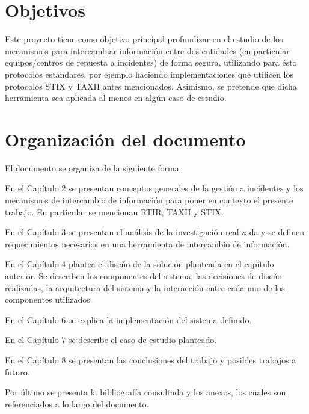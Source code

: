 \section{Objetivos}
\label{capitulo1:objetivos}
Este proyecto tiene como objetivo principal profundizar en el estudio de los mecanismos para intercambiar información entre dos entidades (en particular equipos/centros de repuesta a incidentes) de forma segura, utilizando para ésto protocolos estándares, por ejemplo haciendo implementaciones que utilicen  los protocolos STIX y TAXII antes mencionados. Asimismo, se pretende que dicha herramienta sea aplicada al menos en algún caso de estudio.

\section{Organización del documento}
\label{capitulo1:organizacion}
El documento se organiza de la siguiente forma.

En el Capítulo 2 se presentan conceptos generales de la gestión a incidentes y los mecanismos de intercambio de información para poner en contexto el presente trabajo. En particular se mencionan RTIR, TAXII y STIX.

En el Capítulo 3 se presentan el análisis de la investigación realizada y se definen requerimientos necesarios en una herramienta de intercambio de información.

En el Capítulo 4 plantea el diseño de la solución planteada en el capítulo anterior. Se describen los componentes del sistema, las decisiones de diseño realizadas, la arquitectura del sistema y la interacción entre cada uno de los componentes utilizados.

En el Capítulo 6 se explica la implementación del sistema definido.

En el Capítulo 7 se describe el caso de estudio planteado.

En el Capítulo 8 se presentan las conclusiones del trabajo y posibles trabajos a futuro.

Por último se presenta la bibliografía consultada y los anexos, los cuales son referenciados a lo largo del documento.
